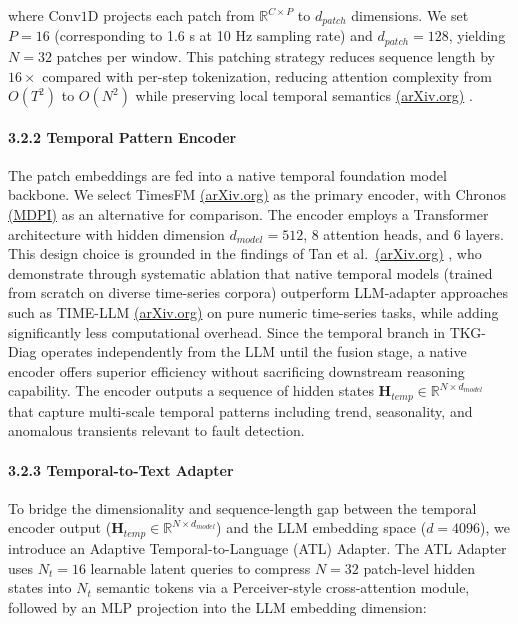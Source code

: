 \documentclass[
  11pt,
]{article}
\begin{document}
where \(\text{Conv1D}\) projects each patch from
\(\mathbb{R}^{C \times P}\) to \(d_{patch}\) dimensions. We set
\(P = 16\) (corresponding to 1.6 s at 10 Hz sampling rate) and
\(d_{patch} = 128\), yielding \(N = 32\) patches per window. This
patching strategy reduces sequence length by \(16\times\) compared with
per-step tokenization, reducing attention complexity from \(O(T^2)\) to
\(O(N^2)\) while preserving local temporal semantics
\href{https://arxiv.org/html/2505.19381v1}{(arXiv.org)} .

\paragraph{3.2.2 Temporal Pattern
Encoder}\label{temporal-pattern-encoder}

The patch embeddings are fed into a native temporal foundation model
backbone. We select TimesFM
\href{https://arxiv.org/html/2410.23262v3}{(arXiv.org)} as the primary
encoder, with Chronos
\href{https://www.mdpi.com/1424-8220/25/19/6033}{(MDPI)} as an
alternative for comparison. The encoder employs a Transformer
architecture with hidden dimension \(d_{model} = 512\), 8 attention
heads, and 6 layers. This design choice is grounded in the findings of
Tan et al.~\href{https://arxiv.org/abs/2411.19443}{(arXiv.org)} , who
demonstrate through systematic ablation that native temporal models
(trained from scratch on diverse time-series corpora) outperform
LLM-adapter approaches such as TIME-LLM
\href{https://arxiv.org/html/2503.11265v1}{(arXiv.org)} on pure numeric
time-series tasks, while adding significantly less computational
overhead. Since the temporal branch in TKG-Diag operates independently
from the LLM until the fusion stage, a native encoder offers superior
efficiency without sacrificing downstream reasoning capability. The
encoder outputs a sequence of hidden states
\(\mathbf{H}_{temp} \in \mathbb{R}^{N \times d_{model}}\) that capture
multi-scale temporal patterns including trend, seasonality, and
anomalous transients relevant to fault detection.

\paragraph{3.2.3 Temporal-to-Text
Adapter}\label{temporal-to-text-adapter}

To bridge the dimensionality and sequence-length gap between the
temporal encoder output
(\(\mathbf{H}_{temp} \in \mathbb{R}^{N \times d_{model}}\)) and the LLM
embedding space (\(d = 4096\)), we introduce an Adaptive
Temporal-to-Language (ATL) Adapter. The ATL Adapter uses \(N_t = 16\)
learnable latent queries to compress \(N = 32\) patch-level hidden
states into \(N_t\) semantic tokens via a Perceiver-style
cross-attention module, followed by an MLP projection into the LLM
embedding dimension:
\end{document}
